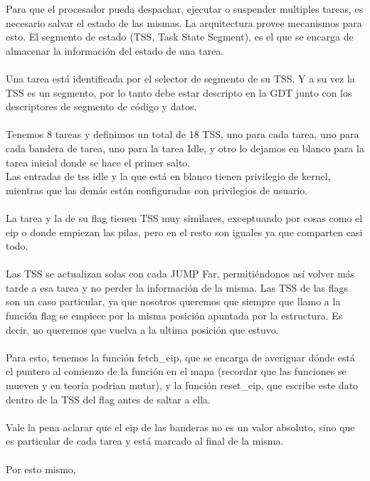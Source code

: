 Para que el procesador pueda despachar, ejecutar o suspender multiples tareas, es necesario salvar el estado de las mismas. La arquitectura provee mecanismos para esto. El segmento de estado (TSS, Task State Segment), es el que se encarga de almacenar la informaci\'on del estado de una tarea.\\
\\
Una tarea est\'a identificada por el selector de segmento de su TSS. Y a su vez la TSS es un segmento, por lo tanto debe estar descripto en la GDT junto con los descriptores de segmento de c\'odigo y datos.\\
\\
Tenemos 8 tareas y definimos un total de 18 TSS, uno para cada tarea, uno para cada bandera de tarea, uno para la tarea Idle, y otro lo dejamos en blanco para la tarea inicial donde se hace el primer salto.\\
Las entradas de tss idle y la que est\'a en blanco tienen privilegio de kernel, mientras que las dem\'as est\'an configuradas con privilegios de usuario.\\
\\
La tarea y la de su flag tienen TSS muy similares, exceptuando por cosas como el eip o donde empiezan las pilas, pero en el resto son iguales ya que comparten casi todo.\\
\\
Las TSS se actualizan solas con cada JUMP Far, permiti\'endonos as\'i volver m\'as tarde a esa tarea y no perder la informaci\'on de la misma. Las TSS de las flags son un caso particular, ya que nosotros queremos que siempre que llamo a la funci\'on flag se empiece por la misma posici\'on apuntada por la estructura. Es decir, no queremos que vuelva a la ultima posici\'on que estuvo.\\
\\
Para esto, tenemos la funci\'on fetch\_eip, que se encarga de averiguar d\'onde est\'a el puntero al comienzo de la funci\'on en el mapa (recordar que las funciones se mueven y en teor\'ia podrian mutar), y la funci\'on reset\_eip, que escribe este dato dentro de la TSS del flag antes de saltar a ella.\\
\\
Vale la pena aclarar que el eip de las banderas no es un valor absoluto, sino que es particular de cada tarea y est\'a marcado al final de la misma.\\
\\
Por esto mismo,  
